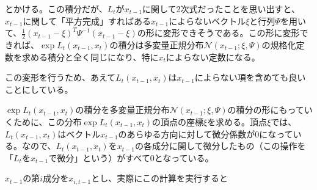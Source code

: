 \documentclass{jarticle}
\begin{document}
とかける。この積分だが、$L_t$が$x_{t-1}$に関して2次式だったことを思い出すと、$x_{t-1}$に関して「平方完成」すればある$x_{t-1}$によらないベクトル$\xi$と行列$\Psi$を用いて、$\frac{1}{2}(x_{t-1}-\xi)^T \Psi^{-1} (x_{t-1}-\xi)$の形に変形できそうである。この形に変形できれば、$\exp L_t (x_{t-1},x_t)$の積分は多変量正規分布$\mathcal{N}(x_{t-1};\xi,\Psi )$の規格化定数を求める積分と全く同じになり、特に$x_t$によらない定数になる。

この変形を行うため、あえて$L_t (x_{t-1},x_t)$は$x_{t-1}$によらない項を含めても良いことにしている。

$\exp L_t (x_{t-1},x_t)$の積分を多変量正規分布$\mathcal{N}(x_{t-1};\xi,\Psi )$の積分の形にもっていくために、この分布$\exp L_t (x_{t-1},x_t)$の頂点の座標$\xi$を求める。頂点$\xi$では、$L_t (x_{t-1},x_t)$はベクトル$x_{t-1}$のあらゆる方向に対して微分係数が0になっている。なので、$L_t (x_{t-1},x_t)$を$x_{t-1}$の各成分に関して微分したもの（この操作を「$L_t$を$x_{t-1}$で微分」という）がすべて0となっている。

$x_{t-1}$の第$i$成分を$x_{i,t-1}$とし、実際にこの計算を実行すると
\end{document}
